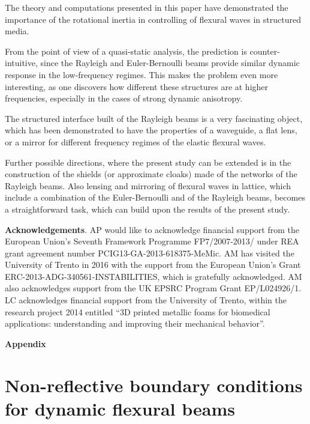 \documentclass[11pt]{article}
\begin{document}
The theory and computations presented in this paper have demonstrated the importance of the rotational inertia in controlling of flexural waves in structured media.

From the point of view of a quasi-static analysis, the prediction is counter-intuitive, since the Rayleigh and Euler-Bernoulli beams provide similar dynamic response in the low-frequency regimes. This makes the problem even more interesting, as one discovers how different these structures are at higher frequencies, especially in the cases of strong dynamic anisotropy.

The structured interface built of the Rayleigh beams is a very fascinating object, which has been demonstrated to have the properties of a waveguide, a flat lens, or a mirror for different frequency regimes of the elastic flexural waves.

Further possible directions, where the present  study can be extended is in the construction of the shields (or approximate cloaks) made of the networks of the Rayleigh beams.  Also lensing and mirroring of flexural waves in lattice, which include a combination of the Euler-Bernoulli and of the Rayleigh beams, becomes a straightforward task, which can build upon the results of the present study.


\vspace{6mm}
{\bf Acknowledgements}. AP would like to acknowledge financial support from the
European Union's Seventh Framework Programme FP7/2007-2013/ under REA grant
agreement number PCIG13-GA-2013-618375-MeMic. 
AM has visited the University of Trento in 2016 with the support from the
European Union's Grant ERC-2013-ADG-340561-INSTABILITIES, which is gratefully acknowledged.
AM also acknowledges support from the UK EPSRC Program Grant  EP/L024926/1.
LC acknowledges financial support from the University of Trento, within the research project 2014 entitled ``3D printed metallic foams for biomedical applications: understanding and improving their mechanical behavior''.


\clearpage
\appendix
\renewcommand{\theequation}{\thesection.\arabic{equation}}

\begin{center}
\bf \Large Appendix
\end{center}

\section{Non-reflective boundary conditions for dynamic flexural beams}
\setcounter{equation}{0}
\end{document}
